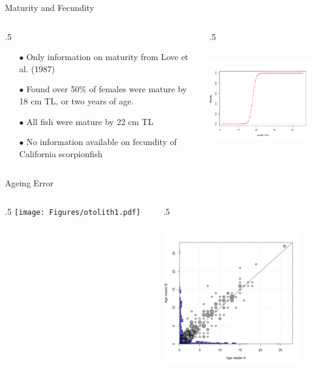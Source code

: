 \documentclass[ignorenonframetext,]{beamer}
\def\begincols{\begin{columns}}
\def\begincol{\begin{column}}
\def\endcol{\end{column}}
\def\endcols{\end{columns}}
\begin{document}
\begin{frame}{Maturity and Fecundity}

\begincols
 \begincol{.5\textwidth}

\begin{itemize}
\item[$\bullet$] Only information on maturity from Love et al. (1987)
\item[$\bullet$] Found over 50\% of females were mature by 18 cm TL, or two years of age. 
\item[$\bullet$] All fish were mature by 22 cm TL
\item[$\bullet$] No information available on fecundity of California scorpionfish
\end{itemize}

\endcol
 \begincol{.5\textwidth}
\includegraphics[height=5cm]{r4ss/plots_mod1/bio6_maturity.png} \endcol
\endcols

\end{frame}

\begin{frame}{Ageing Error}

\begincols
 \begincol{.5\textwidth}
\texttt{[image: Figures/otolith1.pdf]} \endcol
 \begincol{.5\textwidth}

\includegraphics[height=6cm]{Figures/Fleet8_NWFSCTrawl_ageerror.png}\\
\endcol
\endcols

\end{frame}
\end{document}
